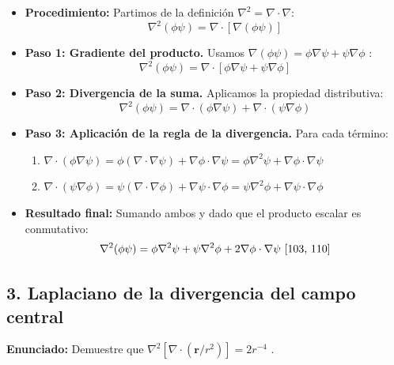 \documentclass[a4paper]{article}
\begin{document}
\begin{itemize}
    \item \textbf{Procedimiento:} Partimos de la definición $\nabla^2 = \nabla \cdot \nabla$:
    \begin{equation*}
        \nabla^2 (\phi \psi) = \nabla \cdot [\nabla (\phi \psi)]
    \end{equation*}
    \item \textbf{Paso 1: Gradiente del producto.} Usamos $\nabla(\phi \psi) = \phi \nabla \psi + \psi \nabla \phi$ \cite{82}:
    \begin{equation*}
        \nabla^2 (\phi \psi) = \nabla \cdot [\phi \nabla \psi + \psi \nabla \phi]
    \end{equation*}
    \item \textbf{Paso 2: Divergencia de la suma.} Aplicamos la propiedad distributiva:
    \begin{equation*}
        \nabla^2 (\phi \psi) = \nabla \cdot (\phi \nabla \psi) + \nabla \cdot (\psi \nabla \phi)
    \end{equation*}
    \item \textbf{Paso 3: Aplicación de la regla de la divergencia.} Para cada término:
    \begin{enumerate}
        \item $\nabla \cdot (\phi \nabla \psi) = \phi (\nabla \cdot \nabla \psi) + \nabla \phi \cdot \nabla \psi = \phi \nabla^2 \psi + \nabla \phi \cdot \nabla \psi$
        \item $\nabla \cdot (\psi \nabla \phi) = \psi (\nabla \cdot \nabla \phi) + \nabla \psi \cdot \nabla \phi = \psi \nabla^2 \phi + \nabla \psi \cdot \nabla \phi$
    \end{enumerate}
    \item \textbf{Resultado final:} Sumando ambos y dado que el producto escalar es conmutativo:
    \begin{equation*}
        \nabla^2 (\phi \psi) = \phi \nabla^2 \psi + \psi \nabla^2 \phi + 2 \nabla \phi \cdot \nabla \psi \text{ \cite{103, 110}}
    \end{equation*}
\end{itemize}

\subsection*{3. Laplaciano de la divergencia del campo central}
\textbf{Enunciado:} Demuestre que $\nabla^2 [\nabla \cdot (\mathbf{r}/r^2)] = 2r^{-4}$ \cite{103, 111}.
\end{document}
